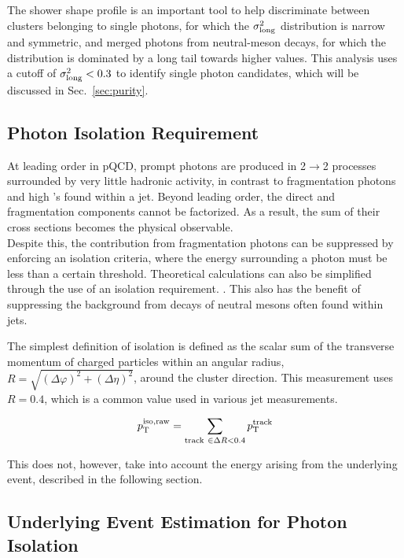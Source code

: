 The shower shape profile is an important tool to help discriminate between clusters belonging to single photons, for which the $\sigma^{2}_{\mathrm{long}}$ distribution is narrow and symmetric, and merged photons from neutral-meson decays, for which the distribution is dominated by a long tail towards higher values. This analysis uses a cutoff of $\sigma^{2}_{\mathrm{long}} < 0.3$ to identify single photon candidates, which will be discussed in Sec.~\ref{sec:purity}.

\subsection{Photon Isolation Requirement}
\label{sec:isolation}
At leading order in pQCD, prompt photons are produced in 2$\to$2 processes surrounded by very little hadronic activity, in contrast to fragmentation photons and high \pt \pizero's found within a jet. Beyond leading order, the direct and fragmentation components cannot be factorized. As a result, the sum of their cross sections becomes the physical observable.\\

Despite this, the contribution from fragmentation photons can be suppressed by enforcing an isolation criteria, where the energy surrounding a photon must be less than a certain threshold. 
Theoretical calculations can also be simplified through the use of an isolation requirement. \cite{PhysRevD.82.014015}. This also has the benefit of suppressing the background from decays of neutral mesons often found within jets.

The simplest definition of isolation is defined as the scalar sum of the transverse momentum of charged particles within an angular radius, $R =\sqrt{(\Delta\varphi)^{2} +(\Delta\eta)^{2}  }$, around the cluster direction. This measurement uses $R = 0.4$, which is a common value used in various jet measurements.

\begin{equation}
p_{\mathrm{T}}^\mathrm{iso,raw} = \sum_{\mathrm{track}~\in\Delta R<0.4} p_{\mathrm{T}}^{\mathrm{track}}	
\end{equation}

This does not, however, take into account the energy arising from the underlying event, described in the following section.


\subsection{Underlying Event Estimation for Photon Isolation}
\label{sec:ue_isolation}

